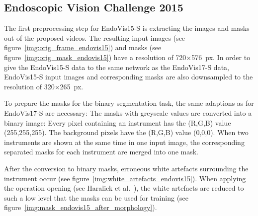 \subsection{Endoscopic Vision Challenge 2015}
\label{sec:prepocess_endovis15} 
The first preprocessing step for EndoVis15-S is extracting the images and masks out of the proposed videos.    
The resulting input images (see figure~\ref{img:orig_frame_endovis15}) and masks (see figure~\ref{img:orig_mask_endovis15}) have a resolution of 720$\times$576~px.
In order to give the EndoVis15-S data to the same network as the EndoVis17-S data, EndoVis15-S input images and corresponding masks are also downsampled to the resolution of 320$\times$265~px.

To prepare the masks for the binary segmentation task, the same adaptions as for \mbox{EndoVis17-S} are necessary:
The masks with greyscale values are converted into a binary image: Every pixel containing an instrument has the (R,G,B) value (255,255,255). The background pixels have the (R,G,B) value (0,0,0).
When two instruments are shown at the same time in one input image, the corresponding separated masks for each instrument are merged into one mask.

After the conversion to binary masks, erroneous white artefacts surrounding the instrument occur (see figure~\ref{img:white_artefacts_endovis15}).
When applying the operation opening (see Haralick et al.~\cite{opening1987haralick}), the white artefacts are reduced to such a low level that the masks can be used for training (see figure~\ref{img:mask_endovis15_after_morphology}).

